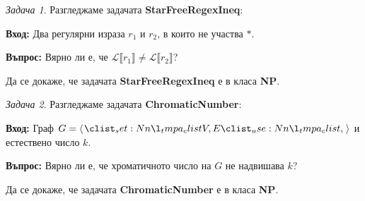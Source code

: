 \documentclass{article}
\theoremstyle{definition}
\theoremstyle{plain}
\theoremstyle{remark}
\newtheorem{problem}{Задача}
\theoremstyle{definition}
\begin{document}
\begin{problem}
Разгледжаме задачата \textbf{StarFreeRegexIneq}:

\vspace*{2mm}
\textbf{Вход:} Два регулярни израза $r_1$ и $r_2$, в които не участва $*$.

\textbf{Въпрос:} Вярно ли е, че $\mathcal{L}\llbracket r_1 \rrbracket \neq \mathcal{L}\llbracket r_2 \rrbracket$?
\vspace*{2mm}

Да се докаже, че задачата \textbf{StarFreeRegexIneq} е в класа \textbf{NP}.
\end{problem}

\begin{problem}
Разгледжаме задачата \textbf{ChromaticNumber}:

\vspace*{2mm}
\textbf{Вход:} Граф $G = \opair{V, E}$ и естествено число $k$.

\textbf{Въпрос:} Вярно ли е, че хроматичното число на $G$ не надвишава $k$?
\vspace*{2mm}

Да се докаже, че задачата \textbf{ChromaticNumber} е в класа \textbf{NP}.
\end{problem}
\end{document}
